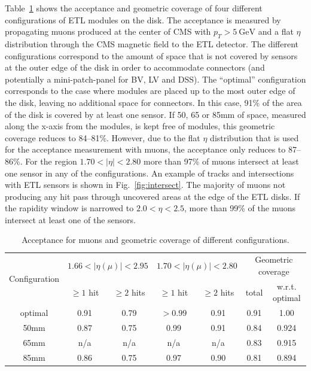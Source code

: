 \documentclass[11pt]{article}
\begin{document}
Table~\ref{tab:coverage} shows the acceptance and geometric coverage of four different configurations of ETL modules on the disk.
The acceptance is measured by propagating muons produced at the center of CMS with $p_{T}>5~\mathrm{GeV}$ and a flat $\eta$ distribution through the CMS magnetic field to the ETL detector.
The different configurations correspond to the amount of space that is not covered by sensors at the outer edge of the disk in order to accommodate connectors (and potentially a mini-patch-panel for BV, LV and DSS).
The ``optimal'' configuration corresponds to the case where modules are placed up to the most outer edge of the disk, leaving no additional space for connectors.
In this case, 91\% of the area of the disk is covered by at least one sensor.
If 50, 65 or 85mm of space, measured along the x-axis from the modules, is kept free of modules, this geometric coverage reduces to 84--81\%.
However, due to the flat $\eta$ distribution that is used for the acceptance measurement with muons, the acceptance only reduces to 87--86\%.
For the region $1.70<|\eta|<2.80$ more than 97\% of muons intersect at least one sensor in any of the configurations.
An example of tracks and intersections with ETL sensors is shown in Fig.~\ref{fig:intersect}.
The majority of muons not producing any hit pass through uncovered areas at the edge of the ETL disks.
If the rapidity window is narrowed to $2.0<\eta<2.5$, more than 99\% of the muons intersect at least one of the sensors.

\begin{table}
  \caption{Acceptance for muons and geometric coverage of different configurations.}
  \label{tab:coverage}
  \begin{tabular}{c|cc|cc|cc}
    \multirow{2}{*}{Configuration} & \multicolumn{2}{c|}{$1.66<|\eta(\mu)|<2.95$} & \multicolumn{2}{c|}{$1.70<|\eta(\mu)|<2.80$} & \multicolumn{2}{c}{Geometric coverage} \\
                  & $\geq1$ hit & $\geq2$ hits  & $\geq1$ hit & $\geq2$ hits  & total & w.r.t. optimal \\ \hline
    optimal       & 0.91        & 0.79          & $>0.99$     & 0.91          & 0.91  & 1.00            \\
    50mm          & 0.87        & 0.75          & 0.99        & 0.91          & 0.84  & 0.924 \\
    65mm          & n/a         & n/a           & n/a         & n/a           & 0.83  & 0.915 \\
    85mm          & 0.86        & 0.75          & 0.97        & 0.90          & 0.81  & 0.894

  \end{tabular}
\end{table}
\end{document}
